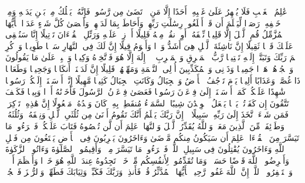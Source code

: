 \stopbuffer
\startbuffer[\q:72:26]
عَٰلِمُ ٱلۡغَیۡبِ فَلَا یُظۡهِرُ عَلَىٰ غَیۡبِهِۦۤ أَحَدًا%
\stopbuffer
\startbuffer[\q:72:27]
إِلَّا مَنِ ٱرۡتَضَىٰ مِن رَّسُولࣲ فَإِنَّهُۥ یَسۡلُكُ مِنۢ بَیۡنِ یَدَیۡهِ وَمِنۡ خَلۡفِهِۦ رَصَدࣰا%
\stopbuffer
\startbuffer[\q:72:28]
لِّیَعۡلَمَ أَن قَدۡ أَبۡلَغُوا۟ رِسَٰلَٰتِ رَبِّهِمۡ وَأَحَاطَ بِمَا لَدَیۡهِمۡ وَأَحۡصَىٰ كُلَّ شَیۡءٍ عَدَدَۢا%
\stopbuffer
\startbuffer[\q:73:1]
یَٰۤأَیُّهَا ٱلۡمُزَّمِّلُ%
\stopbuffer
\startbuffer[\q:73:2]
قُمِ ٱلَّیۡلَ إِلَّا قَلِیلࣰا%
\stopbuffer
\startbuffer[\q:73:3]
نِّصۡفَهُۥۤ أَوِ ٱنقُصۡ مِنۡهُ قَلِیلًا%
\stopbuffer
\startbuffer[\q:73:4]
أَوۡ زِدۡ عَلَیۡهِ وَرَتِّلِ ٱلۡقُرۡءَانَ تَرۡتِیلًا%
\stopbuffer
\startbuffer[\q:73:5]
إِنَّا سَنُلۡقِی عَلَیۡكَ قَوۡلࣰا ثَقِیلًا%
\stopbuffer
\startbuffer[\q:73:6]
إِنَّ نَاشِئَةَ ٱلَّیۡلِ هِیَ أَشَدُّ وَطۡءࣰا وَأَقۡوَمُ قِیلًا%
\stopbuffer
\startbuffer[\q:73:7]
إِنَّ لَكَ فِی ٱلنَّهَارِ سَبۡحࣰا طَوِیلࣰا%
\stopbuffer
\startbuffer[\q:73:8]
وَٱذۡكُرِ ٱسۡمَ رَبِّكَ وَتَبَتَّلۡ إِلَیۡهِ تَبۡتِیلࣰا%
\stopbuffer
\startbuffer[\q:73:9]
رَّبُّ ٱلۡمَشۡرِقِ وَٱلۡمَغۡرِبِ لَاۤ إِلَٰهَ إِلَّا هُوَ فَٱتَّخِذۡهُ وَكِیلࣰا%
\stopbuffer
\startbuffer[\q:73:10]
وَٱصۡبِرۡ عَلَىٰ مَا یَقُولُونَ وَٱهۡجُرۡهُمۡ هَجۡرࣰا جَمِیلࣰا%
\stopbuffer
\startbuffer[\q:73:11]
وَذَرۡنِی وَٱلۡمُكَذِّبِینَ أُو۟لِی ٱلنَّعۡمَةِ وَمَهِّلۡهُمۡ قَلِیلًا%
\stopbuffer
\startbuffer[\q:73:12]
إِنَّ لَدَیۡنَاۤ أَنكَالࣰا وَجَحِیمࣰا%
\stopbuffer
\startbuffer[\q:73:13]
وَطَعَامࣰا ذَا غُصَّةࣲ وَعَذَابًا أَلِیمࣰا%
\stopbuffer
\startbuffer[\q:73:14]
یَوۡمَ تَرۡجُفُ ٱلۡأَرۡضُ وَٱلۡجِبَالُ وَكَانَتِ ٱلۡجِبَالُ كَثِیبࣰا مَّهِیلًا%
\stopbuffer
\startbuffer[\q:73:15]
إِنَّاۤ أَرۡسَلۡنَاۤ إِلَیۡكُمۡ رَسُولࣰا شَٰهِدًا عَلَیۡكُمۡ كَمَاۤ أَرۡسَلۡنَاۤ إِلَىٰ فِرۡعَوۡنَ رَسُولࣰا%
\stopbuffer
\startbuffer[\q:73:16]
فَعَصَىٰ فِرۡعَوۡنُ ٱلرَّسُولَ فَأَخَذۡنَٰهُ أَخۡذࣰا وَبِیلࣰا%
\stopbuffer
\startbuffer[\q:73:17]
فَكَیۡفَ تَتَّقُونَ إِن كَفَرۡتُمۡ یَوۡمࣰا یَجۡعَلُ ٱلۡوِلۡدَٰنَ شِیبًا%
\stopbuffer
\startbuffer[\q:73:18]
ٱلسَّمَاۤءُ مُنفَطِرُۢ بِهِۦۚ كَانَ وَعۡدُهُۥ مَفۡعُولًا%
\stopbuffer
\startbuffer[\q:73:19]
إِنَّ هَٰذِهِۦ تَذۡكِرَةࣱۖ فَمَن شَاۤءَ ٱتَّخَذَ إِلَىٰ رَبِّهِۦ سَبِیلًا%
\stopbuffer
\startbuffer[\q:73:20]
۞ إِنَّ رَبَّكَ یَعۡلَمُ أَنَّكَ تَقُومُ أَدۡنَىٰ مِن ثُلُثَیِ ٱلَّیۡلِ وَنِصۡفَهُۥ وَثُلُثَهُۥ وَطَاۤئِفَةࣱ مِّنَ ٱلَّذِینَ مَعَكَۚ وَٱللَّهُ یُقَدِّرُ ٱلَّیۡلَ وَٱلنَّهَارَۚ عَلِمَ أَن لَّن تُحۡصُوهُ فَتَابَ عَلَیۡكُمۡۖ فَٱقۡرَءُوا۟ مَا تَیَسَّرَ مِنَ ٱلۡقُرۡءَانِۚ عَلِمَ أَن سَیَكُونُ مِنكُم مَّرۡضَىٰ وَءَاخَرُونَ یَضۡرِبُونَ فِی ٱلۡأَرۡضِ یَبۡتَغُونَ مِن فَضۡلِ ٱللَّهِ وَءَاخَرُونَ یُقَٰتِلُونَ فِی سَبِیلِ ٱللَّهِۖ فَٱقۡرَءُوا۟ مَا تَیَسَّرَ مِنۡهُۚ وَأَقِیمُوا۟ ٱلصَّلَوٰةَ وَءَاتُوا۟ ٱلزَّكَوٰةَ وَأَقۡرِضُوا۟ ٱللَّهَ قَرۡضًا حَسَنࣰاۚ وَمَا تُقَدِّمُوا۟ لِأَنفُسِكُم مِّنۡ خَیۡرࣲ تَجِدُوهُ عِندَ ٱللَّهِ هُوَ خَیۡرࣰا وَأَعۡظَمَ أَجۡرࣰاۚ وَٱسۡتَغۡفِرُوا۟ ٱللَّهَۖ إِنَّ ٱللَّهَ غَفُورࣱ رَّحِیمُۢ%
\stopbuffer
\startbuffer[\q:74:1]
یَٰۤأَیُّهَا ٱلۡمُدَّثِّرُ%
\stopbuffer
\startbuffer[\q:74:2]
قُمۡ فَأَنذِرۡ%
\stopbuffer
\startbuffer[\q:74:3]
وَرَبَّكَ فَكَبِّرۡ%
\stopbuffer
\startbuffer[\q:74:4]
وَثِیَابَكَ فَطَهِّرۡ%
\stopbuffer
\startbuffer[\q:74:5]
وَٱلرُّجۡزَ فَٱهۡجُرۡ%
\stopbuffer
